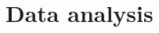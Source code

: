 \documentclass[12pt]{article}
\begin{document}





\section{Data analysis}\label{rbs:dataanalysis}
\end{document}
